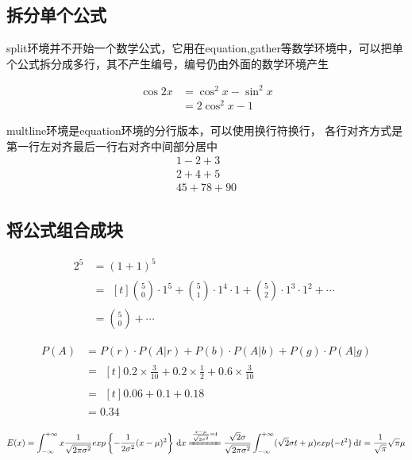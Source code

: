 \documentclass[12pt]{article}
\begin{document}
\subsection{拆分单个公式}
split环境并不开始一个数学公式，它用在equation,gather等数学环境中，可以把单个公式拆分成多行，其不产生编号，编号仍由外面的数学环境产生

\begin{equation}
	\begin{split}
	\cos 2x &= \cos^2 x - \sin^2 x \\
			&= 2\cos^2 x - 1
	\end{split}
\end{equation}


multline环境是equation环境的分行版本，可以使用换行符换行，
各行对齐方式是第一行左对齐最后一行右对齐中间部分居中
\begin{multline}
	1-2+3 \\
	2+4+5\\
	45+78+90
\end{multline}

\subsection{将公式组合成块}

\begin{align*}
	2^5 &= (1+1)^5 \\
	&= \begin{multlined}[t]
	\binom{5}{0}\cdot 1^5 +\binom{5}{1}\cdot 1^4 \cdot 1 + \binom{5}{2}\cdot 1^3 \cdot 1^2 
	+ \cdots
	\end{multlined}\\
	&= \binom{5}{0}+ \cdots
\end{align*}


\begin{align*}
P(A) &= P(r)\cdot P(A|r) + P(b)\cdot P(A|b) +P(g)\cdot P(A|g)  \\
&= \begin{multlined}[t]
0.2\times \frac{3}{10} + 0.2\times \frac12 +0.6\times \frac{3}{10}
\end{multlined}\\
&= \begin{multlined}[t]
0.06+0.1+0.18
\end{multlined}\\
&= 0.34
\end{align*}

\[
E(x) = \int_{-\infty}^{+\infty} x\frac1{ \sqrt{2\pi\sigma^2}} 
exp \left\{ -\frac{1}{2\sigma^2} (x-\mu)^2 \right\} \,\mathrm{d}x \\
\xlongequal{\frac{x-\mu}{\sqrt{2\sigma^2}} = t } \\
\frac{\sqrt{2}\sigma}{\sqrt{2\pi\sigma^2}}\int_{-\infty}^{+\infty} (\sqrt{2}\sigma t + \mu) exp\{-t^2\} \,\mathrm{d}t\\
= \frac1{\sqrt\pi}\sqrt{\pi}\mu
\]



	
	
	
\end{document}
